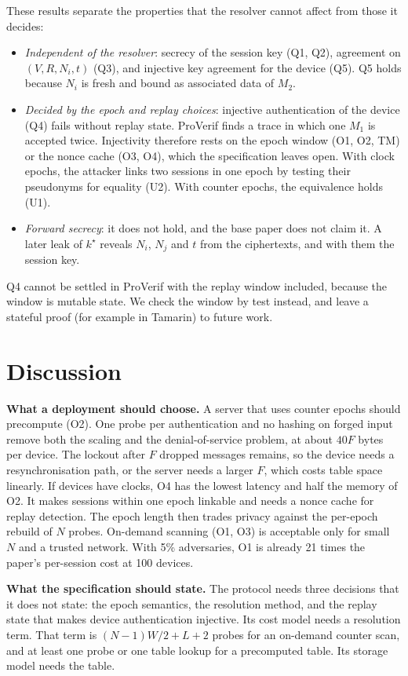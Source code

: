 These results separate the properties that the resolver cannot affect from those it decides:
\begin{itemize}
\item \emph{Independent of the resolver}: secrecy of the session key (Q1, Q2), agreement on $(V,R,N_i,t)$ (Q3), and
injective key agreement for the device (Q5). Q5 holds because $N_i$ is fresh and bound as associated data of $M_2$.
\item \emph{Decided by the epoch and replay choices}: injective authentication of the device (Q4) fails without replay
state. ProVerif finds a trace in which one $M_1$ is accepted twice. Injectivity therefore rests on the epoch window (O1,
O2, TM) or the nonce cache (O3, O4), which the specification leaves open. With clock epochs, the attacker links two
sessions in one epoch by testing their pseudonyms for equality (U2). With counter epochs, the equivalence holds (U1).
\item \emph{Forward secrecy}: it does not hold, and the base paper does not claim it. A later leak of $k^\star$ reveals
$N_i$, $N_j$ and $t$ from the ciphertexts, and with them the session key.
\end{itemize}
Q4 cannot be settled in ProVerif with the replay window included, because the window is mutable state. We check the
window by test instead, and leave a stateful proof (for example in Tamarin) to future work.
\fi

\section{Discussion}
\textbf{What a deployment should choose.} A server that uses counter epochs should precompute (O2). One probe per
authentication and no hashing on forged input remove both the scaling and the denial-of-service problem, at about
$40F$ bytes per device. The lockout after $F$ dropped messages remains, so the device needs a resynchronisation path, or
the server needs a larger $F$, which costs table space linearly. If devices have clocks, O4 has the lowest latency and
half the memory of O2. It makes sessions within one epoch linkable and needs a nonce cache for replay detection. The
epoch length then trades privacy against the per-epoch rebuild of $N$ probes. On-demand scanning (O1, O3) is
acceptable only for small $N$ and a trusted network. With 5\% adversaries, O1 is already 21 times the paper's
per-session cost at 100 devices.

\textbf{What the specification should state.} The protocol needs three decisions that it does not state: the epoch
semantics, the resolution method, and the replay state that makes device authentication injective. Its cost model
needs a resolution term. That term is $(N-1)W/2+L+2$ probes for an on-demand counter scan, and at least one probe or
one table lookup for a precomputed table. Its storage model needs the table.

